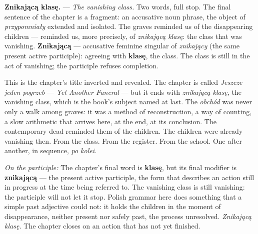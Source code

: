 \textbf{Znikającą klasę.} --- \textit{The vanishing
class.} Two words, full stop. The final sentence of
the chapter is a fragment: an accusative noun phrase,
the object of \textit{przypomniały} extended and
isolated. The graves reminded us of the disappearing
children --- reminded us, more precisely, of
\textit{znikającą klasę}: the class that was
vanishing. \textbf{Znikającą} --- accusative feminine
singular of \textit{znikający} (the same present
active participle): agreeing with \textbf{klasę},
the class. The class is still in the act of vanishing;
the participle refuses completion.

\medskip
This is the chapter's title inverted and revealed.
The chapter is called \textit{Jeszcze jeden pogrzeb}
--- \textit{Yet Another Funeral} --- but it ends with
\textit{znikającą klasę}, the vanishing class, which
is the book's subject named at last. The \textit{obchód}
was never only a walk among graves: it was a method
of reconstruction, a way of counting, a slow arithmetic
that arrives here, at the end, at its conclusion.
The contemporary dead reminded them of the children.
The children were already vanishing then. From the
class. From the register. From the school. One
after another, in sequence, \textit{po kolei}.

\medskip
\noindent\textit{On the participle:} The chapter's
final word is \textbf{klasę}, but its final modifier
is \textbf{znikającą} --- the present active
participle, the form that describes an action still
in progress at the time being referred to. The
vanishing class is still vanishing: the participle
will not let it stop. Polish grammar here does
something that a simple past adjective could not:
it holds the children in the moment of disappearance,
neither present nor safely past, the process
unresolved. \textit{Znikającą klasę.} The chapter
closes on an action that has not yet finished.

